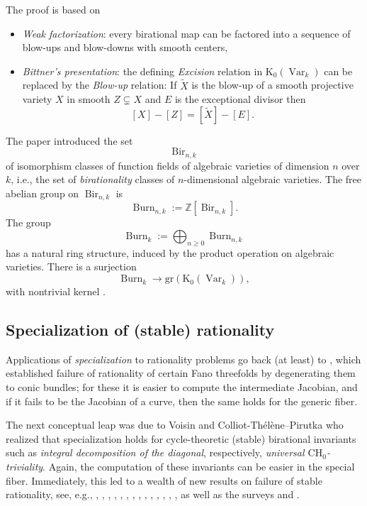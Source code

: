 \documentclass[12pt,reqno]{amsart}
\theoremstyle{plain}
\theoremstyle{remark}
\theoremstyle{definition}
\numberwithin{equation}{section}
\newcommand{\bZ}{{\mathbb Z}}
\DeclareMathOperator{\Var}{Var}
\DeclareMathOperator{\Burn}{Burn}
\DeclareMathOperator{\Bir}{Bir}
\begin{document}
The proof is based on 
\begin{itemize}
\item {\em Weak factorization}: every birational map can be factored into a sequence of blow-ups and blow-downs with smooth centers,
\item {\em Bittner's presentation}: the defining 
{\em Excision} relation in  $\mathrm K_0(\Var_k)$
can be replaced by the {\em Blow-up} relation: If $\widetilde{X}$ is the blow-up of a smooth projective variety $X$ in smooth $Z\subsetneq X$ and $E$ is the exceptional divisor then  
$$
[X] - [Z]= [\widetilde{X}]- [E].
$$
\end{itemize}

The paper \cite{KT} introduced the set 
$$
\Bir_{n,k}
$$
of isomorphism classes of function fields of algebraic varieties of dimension $n$ over $k$, i.e., the set of {\em birationality} classes of $n$-dimensional algebraic varieties. The free abelian group on $\Bir_{n,k}$ is
$$
\Burn_{n,k}:=\bZ[\Bir_{n,k}].
$$
The group
$$
\Burn_k:=\bigoplus_{n\ge 0} \Burn_{n,k}
$$
has a natural ring structure, induced by the product operation on algebraic varieties. There is a surjection 
$$
\Burn_k \to \mathrm{gr}(\mathrm K_0(\Var_k)),
$$
with nontrivial kernel 
\cite[Thm.\ 2.13]{borisov}.




\subsection*{Specialization of (stable) rationality}
Applications of {\em specialization} to rationality problems go back (at least) to \cite{Beau}, which established failure of rationality of certain Fano threefolds by degenerating them to conic bundles; for  these it is easier to compute the intermediate Jacobian, and if it fails to be the Jacobian of a curve, then the same holds for the generic fiber. 

The next conceptual leap was due to Voisin \cite{voisin} and Colliot-Th\'el\`ene--Pirutka \cite{CTP} who realized that specialization holds for cycle-theoretic (stable) birational invariants such as {\em integral decomposition of the diagonal}, respectively, {\em universal $\mathrm{CH}_0$-triviality}. Again, the computation of these invariants can be easier in the special fiber. 
Immediately, this led to a wealth of new results on failure of stable rationality, see, e.g., \cite{voisin}, \cite{CTP}, 
\cite{P-cyclic}, \cite{totaro-hyper}, \cite{HKTconic}, \cite{HT-Fano}, \cite{HPT-quadric}, 
\cite{HPT-quartic}, \cite{HPT-3quad}, \cite{KT-SRBS}, \cite{Schr-2}, \cite{ABP}, \cite{Schr-small-slopes}, \cite{NO-tropical}, 
as well as the surveys \cite{peyre} and \cite{CT-schrei}.    
\end{document}
